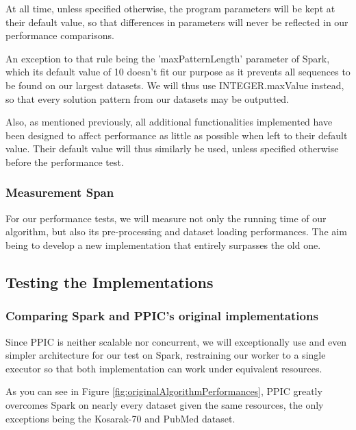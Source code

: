 \documentclass{eplmastersthesis}
\begin{document}
At all time, unless specified otherwise, the program parameters will be kept at their default value, so that differences in parameters will never be reflected in our performance comparisons.\newline

An exception to that rule being the 'maxPatternLength' parameter of Spark, which its default value of 10 doesn't fit our purpose as it prevents all sequences to be found on our largest datasets. We will thus use INTEGER.maxValue instead, so that every solution pattern from our datasets may be outputted.\newline

Also, as mentioned previously, all additional functionalities implemented have been designed to affect performance as little as possible when left to their default value. Their default value will thus similarly be used, unless specified otherwise before the performance test.

\subsubsection{Measurement Span}

For our performance tests, we will measure not only the running time of our algorithm, but also its pre-processing and dataset loading performances. The aim being to develop a new implementation that entirely surpasses the old one.

\subsection{Testing the Implementations}

\subsubsection{Comparing Spark and PPIC's original implementations}

Since PPIC is neither scalable nor concurrent, we will exceptionally use and even simpler architecture for our test on Spark, restraining our worker to a single executor so that both implementation can work under equivalent resources. \newline

As you can see in Figure \ref{fig:originalAlgorithmPerformances}, PPIC greatly overcomes Spark on nearly every dataset given the same resources, the only exceptions being the Kosarak-70 and PubMed dataset. \newline
\end{document}
